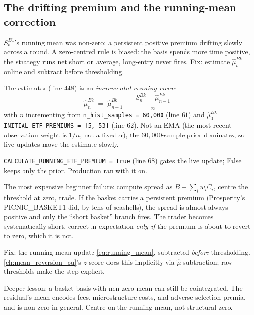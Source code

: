 \subsection{The drifting premium and the running-mean correction}
\label{sec:ch11_hh_premium_drift}

$S^{B1}_t$'s running mean was non-zero: a persistent positive
premium drifting slowly across a round. A zero-centred rule is
biased: the basis spends more time positive, the strategy runs
net short on average, long-entry never fires. Fix: estimate
$\hat\mu^{Bk}_t$ online and subtract before thresholding.

The estimator (line $448$) is an \emph{incremental running mean}:
\begin{equation}
  \hat\mu^{Bk}_n
  \;=\; \hat\mu^{Bk}_{n-1}
  \;+\; \frac{S^{Bk}_n - \hat\mu^{Bk}_{n-1}}{n}
  \label{eq:running_mean}
\end{equation}
with $n$ incrementing from \texttt{n\_hist\_samples = 60{,}000}
(line $61$) and $\hat\mu^{Bk}_0 =$
\texttt{INITIAL\_ETF\_PREMIUMS = [5, 53]} (line $62$). Not an EMA
(the most-recent-observation weight is $1/n$, not a fixed
$\alpha$); the $60{,}000$-sample prior dominates, so live updates
move the estimate slowly.

\texttt{CALCULATE\_RUNNING\_ETF\_PREMIUM = True} (line $68$)
gates the live update; False keeps only the prior. Production ran
with it on.

\begin{pitfallbox}
\label{pitfall:basket_premium}
The most expensive beginner failure: compute spread as
$B - \sum_i w_i C_i$, centre the threshold at zero, trade. If the
basket carries a persistent premium (Prosperity's
PICNIC\_BASKET$1$ did, by tens of seashells), the spread is
almost always positive and only the ``short basket'' branch
fires. The trader becomes systematically short, correct in
expectation \emph{only if} the premium is about to revert to zero,
which it is not.

Fix: the running-mean update \eqref{eq:running_mean}, subtracted
\emph{before} thresholding. \cref{ch:mean_reversion_ou}'s
$z$-score does this implicitly via $\hat\mu$ subtraction; raw
thresholds make the step explicit.

Deeper lesson: a basket basis with non-zero mean can still be
cointegrated. The residual's mean encodes fees, microstructure
costs, and adverse-selection premia, and is non-zero in general.
Centre on the running mean, not structural zero.
\end{pitfallbox}

